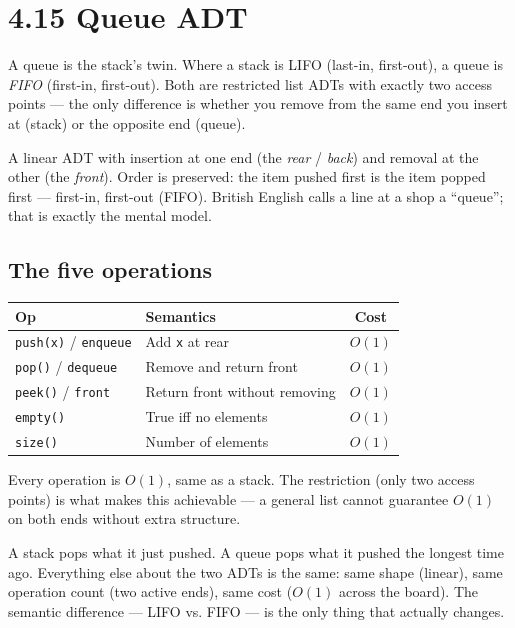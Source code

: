 \documentclass[11pt]{article}
\begin{document}
\section{4.15 Queue ADT}

A queue is the stack's twin. Where a stack is LIFO (last-in,
first-out), a queue is \emph{FIFO} (first-in, first-out). Both
are restricted list ADTs with exactly two access points --- the
only difference is whether you remove from the same end you insert
at (stack) or the opposite end (queue).

\begin{defnbox}[Queue]
A linear ADT with insertion at one end (the \emph{rear} /
\emph{back}) and removal at the other (the \emph{front}). Order
is preserved: the item pushed first is the item popped first ---
first-in, first-out (FIFO). British English calls a line at a
shop a ``queue''; that is exactly the mental model.
\end{defnbox}

\subsection*{The five operations}

\begin{center}
\begin{tabular}{|l|l|c|}
\hline
\textbf{Op} & \textbf{Semantics} & \textbf{Cost} \\
\hline
\texttt{push(x)} / \texttt{enqueue} & Add \texttt{x} at rear & $O(1)$ \\
\texttt{pop()}   / \texttt{dequeue} & Remove and return front & $O(1)$ \\
\texttt{peek()}  / \texttt{front}   & Return front without removing & $O(1)$ \\
\texttt{empty()} & True iff no elements & $O(1)$ \\
\texttt{size()}  & Number of elements   & $O(1)$ \\
\hline
\end{tabular}
\end{center}

Every operation is $O(1)$, same as a stack. The restriction
(only two access points) is what makes this achievable --- a
general list cannot guarantee $O(1)$ on both ends without extra
structure.

\begin{ideabox}
A stack pops what it just pushed. A queue pops what it pushed
the longest time ago. Everything else about the two ADTs is the
same: same shape (linear), same operation count (two active
ends), same cost ($O(1)$ across the board). The semantic
difference --- LIFO vs. FIFO --- is the only thing that actually
changes.
\end{ideabox}
\end{document}
